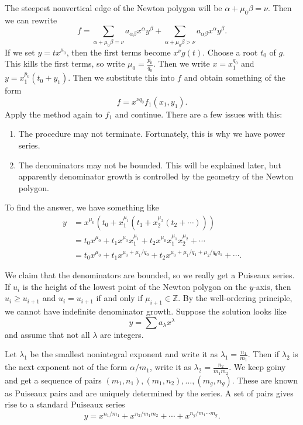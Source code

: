 \documentclass[leqno, openany]{memoir}
\theoremstyle{definition}
\theoremstyle{remark}
\theoremstyle{plain}
\theoremstyle{definition}
\theoremstyle{remark}
\newcommand{\Z}{\mathbb{Z}}
\begin{document}
The steepest nonvertical edge of the Newton polygon will be $\alpha + \mu_0 \beta = \nu$. Then we can rewrite
\[ f = \sum_{\alpha + \mu_0 \beta = \nu} a_{\alpha\beta}x^{\alpha}y^{\beta} + \sum_{\alpha+\mu_0\beta>\nu} a_{\alpha\beta}x^{\alpha}y^{\beta}. \]
If we set $y = tx^{\mu_0}$, then the first terms become $x^{\nu} g(t)$. Choose a root $t_0$ of $g$. This kills the first terms, so write $\mu_0 = \frac{p_0}{q_0}$. Then we write $x = x_1^{q_0}$ and $y = x_1^{p_0}(t_0 + y_1)$. Then we substitute this into $f$ and obtain something of the form
\[ f = x^{\nu q_0} f_1(x_1, y_1). \]
Apply the method again to $f_1$ and continue. There are a few issues with this:
\begin{enumerate}
    \item The procedure may not terminate. Fortunately, this is why we have power series.
    \item The denominators may not be bounded. This will be explained later, but apparently denominator growth is controlled by the geometry of the Newton polygon.
\end{enumerate}
To find the answer, we have something like
\begin{align*}
    y &= x^{\mu_0} (t_0 + x_1^{\mu_1}(t_1 + x_2^{\mu_2}(t_2 + \cdots))) \\
      &= t_0 x^{\mu_0} + t_1 x^{\mu_0}x_1^{\mu_1} + t_2 x^{\mu_0} x_1^{\mu_1} x_2^{\mu_2} + \cdots \\
      &= t_0 x^{\mu_0} + t_1 x^{\mu_0 + \mu_1/q_0} + t_2 x^{\mu_0 + \mu_1/q_1 + \mu_2/q_0q_1} + \cdots.
\end{align*}

We claim that the denominators are bounded, so we really get a Puiseaux series. If $u_i$ is the height of the lowest point of the Newton polygon on the $y$-axis, then $u_i \geq u_{i+1}$ and $u_i = u_{i+1}$ if and only if $\mu_{i+1} \in \Z$. By the well-ordering principle, we cannot have indefinite denominator growth. Suppose the solution looks like
\[ y = \sum a_{\lambda} x^{\lambda} \]
and assume that not all $\lambda$ are integers. 

Let $\lambda_1$ be the smallest nonintegral exponent and write it as $\lambda_1 = \frac{n_1}{m_1}$. Then if $\lambda_2$ is the next exponent not of the form $\alpha/m_1$, write it as $\lambda_2 = \frac{n_2}{m_1m_2}$. We keep goiny and get a sequence of pairs $(m_1, n_1), (m_1, n_2), \ldots, (m_g, n_g)$. These are known as Puiseaux pairs and are uniquely determined by the series. A set of pairs gives rise to a standard Puiseaux series
\[ y = x^{n_1/m_1} + x^{n_2/m_1m_2} + \cdots + x^{n_g/m_1\cdots m_g}. \]
\end{document}

